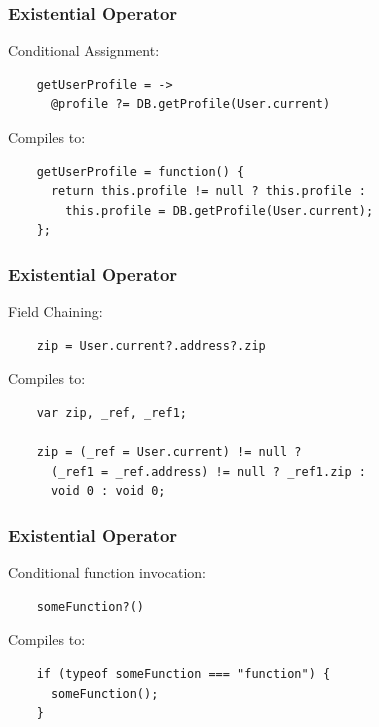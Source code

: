 \documentclass{beamer}
\begin{document}
%
%
 \begin{frame}[fragile]
  \frametitle{Existential Operator}


  Conditional Assignment:

  \begin{verbatim}
    getUserProfile = ->
      @profile ?= DB.getProfile(User.current)
  \end{verbatim}

  \pause
  \vspace{.5cm}
  Compiles to:
  \vspace{.5cm}

  \begin{verbatim}
    getUserProfile = function() {
      return this.profile != null ? this.profile : 
        this.profile = DB.getProfile(User.current);
    };
  \end{verbatim}  
\end{frame}

 \begin{frame}[fragile]
  \frametitle{Existential Operator}


  Field Chaining:

  \begin{verbatim}
    zip = User.current?.address?.zip
  \end{verbatim}

  \pause
  \vspace{.5cm}
  Compiles to:
  \vspace{.5cm}

  \begin{verbatim}
    var zip, _ref, _ref1;

    zip = (_ref = User.current) != null ? 
      (_ref1 = _ref.address) != null ? _ref1.zip : 
      void 0 : void 0;
  \end{verbatim}  
\end{frame}

 \begin{frame}[fragile]
  \frametitle{Existential Operator}

  Conditional function invocation:

  \begin{verbatim}
    someFunction?()
  \end{verbatim}

  \pause
  \vspace{.5cm}
  Compiles to:
  \vspace{.5cm}

  \begin{verbatim}
    if (typeof someFunction === "function") {
      someFunction();
    }
  \end{verbatim}  
\end{frame}
\end{document}

